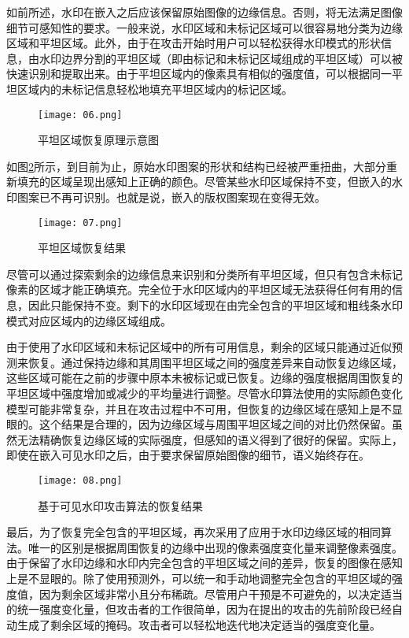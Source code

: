 如前所述，水印在嵌入之后应该保留原始图像的边缘信息。否则，将无法满足图像细节可感知性的要求。一般来说，水印区域和未标记区域可以很容易地分类为边缘区域和平坦区域。此外，由于在攻击开始时用户可以轻松获得水印模式的形状信息，由水印边界分割的平坦区域（即由标记和未标记区域组成的平坦区域）可以被快速识别和提取出来。由于平坦区域内的像素具有相似的强度值，可以根据同一平坦区域内的未标记信息轻松地填充平坦区域内的标记区域。

\begin{figure}[!htbp]
	\centering
	\texttt{[image: 06.png]}
	\caption{平坦区域恢复原理示意图}
	\label{fig:06}
\end{figure}

如图\ref{fig:07}所示，到目前为止，原始水印图案的形状和结构已经被严重扭曲，大部分重新填充的区域呈现出感知上正确的颜色。尽管某些水印区域保持不变，但嵌入的水印图案已不再可识别。也就是说，嵌入的版权图案现在变得无效。

\begin{figure}[!htbp]
	\centering
	\texttt{[image: 07.png]}
	\caption{平坦区域恢复结果}
	\label{fig:07}
\end{figure}

尽管可以通过探索剩余的边缘信息来识别和分类所有平坦区域，但只有包含未标记像素的区域才能正确填充。完全位于水印区域内的平坦区域无法获得任何有用的信息，因此只能保持不变。剩下的水印区域现在由完全包含的平坦区域和粗线条水印模式对应区域内的边缘区域组成。

由于使用了水印区域和未标记区域中的所有可用信息，剩余的区域只能通过近似预测来恢复。通过保持边缘和其周围平坦区域之间的强度差异来自动恢复边缘区域，这些区域可能在之前的步骤中原本未被标记或已恢复。边缘的强度根据周围恢复的平坦区域中强度增加或减少的平均量进行调整。尽管水印算法使用的实际颜色变化模型可能非常复杂，并且在攻击过程中不可用，但恢复的边缘区域在感知上是不显眼的。这个结果是合理的，因为边缘区域与周围平坦区域之间的对比仍然保留。虽然无法精确恢复边缘区域的实际强度，但感知的语义得到了很好的保留。实际上，即使在嵌入可见水印之后，由于要求保留原始图像的细节，语义始终存在。

\begin{figure}[!htbp]
	\centering
	\texttt{[image: 08.png]}
	\caption{基于可见水印攻击算法的恢复结果}
	\label{fig:08}
\end{figure}

最后，为了恢复完全包含的平坦区域，再次采用了应用于水印边缘区域的相同算法。唯一的区别是根据周围恢复的边缘中出现的像素强度变化量来调整像素强度。由于保留了水印边缘和水印内完全包含的平坦区域之间的差异，恢复的图像在感知上是不显眼的。除了使用预测外，可以统一和手动地调整完全包含的平坦区域的强度值，因为剩余区域非常小且分布稀疏。尽管用户干预是不可避免的，以决定适当的统一强度变化量，但攻击者的工作很简单，因为在提出的攻击的先前阶段已经自动生成了剩余区域的掩码。攻击者可以轻松地迭代地决定适当的强度变化量。

